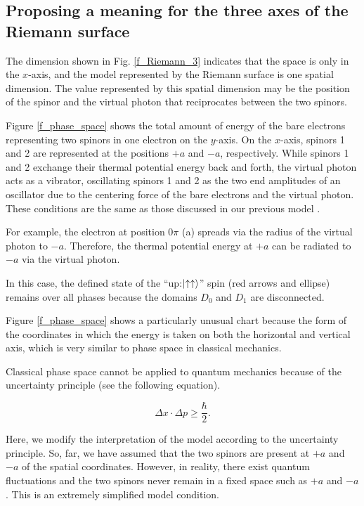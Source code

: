\documentclass[reprint,amsmath,amssymb,aps,]{revtex4-1}
\numberwithin{equation}{section}%
\begin{document}
\subsection{\label{sec:Proposing a meaning for the three axes of the Riemann surface}Proposing a meaning for the three axes of the Riemann surface}

    The dimension shown in Fig. \ref{f_Riemann_3} indicates that the space is only in the $x$-axis, and the model represented by the Riemann surface is one spatial dimension. The value represented by this spatial dimension may be the position of the spinor and the virtual photon that reciprocates between the two spinors.

    Figure \ref{f_phase_space} shows the total amount of energy of the bare electrons representing two spinors in one electron on the $y$-axis. On the $x$-axis, spinors 1 and 2 are represented at the positions $+a$ and $-a$, respectively. While spinors 1 and 2 exchange their thermal potential energy back and forth, the virtual photon acts as a vibrator, oscillating spinors 1 and 2 as the two end amplitudes of an oscillator due to the centering force of the bare electrons and the virtual photon. These conditions are the same as those discussed in our previous model \cite{Hanamura}.

    For example, the electron at position $0\pi$ (a) spreads via the radius of the virtual photon to $-a$. Therefore, the thermal potential energy at $+a$ can be radiated to $-a$ via the virtual photon.
    
    In this case, the defined state of the ``up:$\ket{\uparrow \uparrow}$'' spin (red arrows and ellipse) remains over all phases because the domains $D_{0}$ and $D_{1}$ are disconnected.
    
    Figure \ref{f_phase_space} shows a particularly unusual chart because the form of the coordinates in which the energy is taken on both the horizontal and vertical axis, which is very similar to phase space in classical mechanics.
    
    Classical phase space cannot be applied to quantum mechanics because of the uncertainty principle (see the following equation).

    \begin{equation}
        \Delta x \cdot \Delta p \geq \frac{\hbar}{2}
        .
        \label{e_uncertainty}
    \end{equation}

    Here, we modify the interpretation of the model according to the uncertainty principle. So, far, we have assumed that the two spinors are present at $+a$ and $-a$ of the spatial coordinates. However, in reality, there exist quantum fluctuations and the two spinors never remain in a fixed space such as $+a$ and $-a$. This is an extremely simplified model condition.
    
\end{document}
